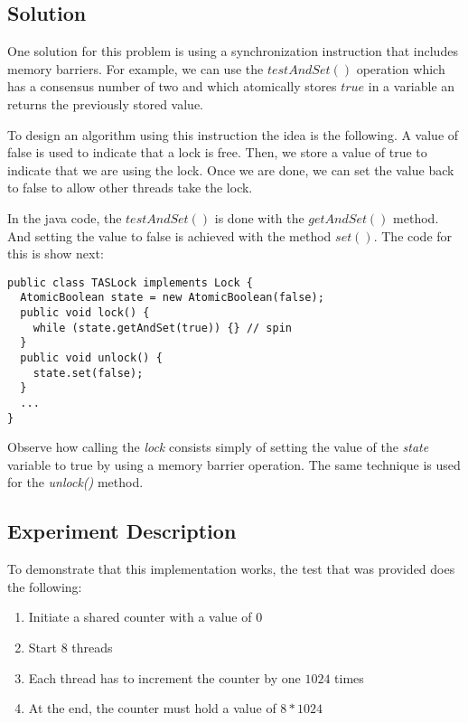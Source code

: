 \subsection{Solution}
\par
One solution for this problem is using a synchronization instruction that
includes memory barriers. For example, we can use the $testAndSet()$ operation
which has a consensus number of two and which atomically stores $true$ in a
variable an returns the previously stored value. 
\par
To design an algorithm using this instruction the idea is the following. A value
of false is used to indicate that a lock is free. Then, we store a value of true
to indicate that we are using the lock. Once we are done, we can set the value
back to false to allow other threads take the lock.
\par
In the java code, the $testAndSet()$ is done with the $getAndSet()$ method. And
setting the value to false is achieved with the method $set()$. The code for
this is show next:
\par
\hfill
\begin{lstlisting}[style=numbers]
public class TASLock implements Lock {
  AtomicBoolean state = new AtomicBoolean(false);
  public void lock() {
    while (state.getAndSet(true)) {} // spin
  }
  public void unlock() {
    state.set(false);
  }
  ...
}
\end{lstlisting}
\hfill
\par
Observe how calling the \textit{lock} consists simply of setting the value of the
\textit{state} variable to true by using a memory barrier operation. The same
technique is used for the \textit{unlock()} method.
\subsection{Experiment Description}
\par
To demonstrate that this implementation works, the test that was provided does
the following:
\begin{enumerate}
\item Initiate a shared counter with a value of $0$
\item Start $8$ threads
\item Each thread has to increment the counter by one $1024$ times
\item At the end, the counter must hold a value of $8*1024$
\end{enumerate}
\par
